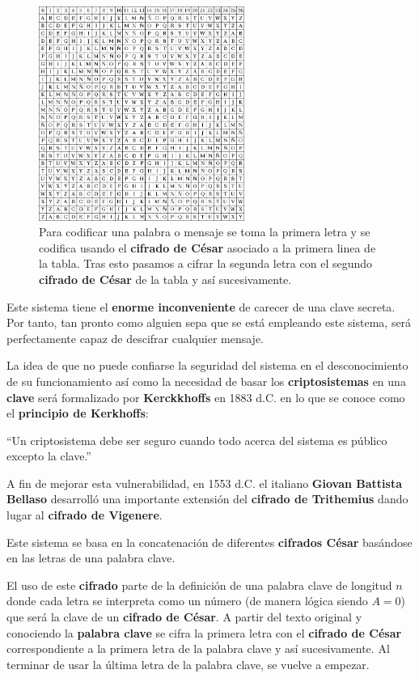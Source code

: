 \documentclass[nochap]{apuntesURJC}
\begin{document}
\begin{figure}[hbtp]
\centering
\includegraphics[width=0.6\textwidth]{img/tabula_recta.png}
\caption{Para codificar una palabra o mensaje se toma la primera letra y se codifica usando el \textbf{cifrado de César} asociado a la primera linea de la tabla. Tras esto pasamos a cifrar la segunda letra con el segundo \textbf{cifrado de César} de la tabla y así sucesivamente.}
\label{fig:tabula_recta}
\end{figure}

Este sistema tiene el \textbf{enorme inconveniente} de carecer de una clave secreta. Por tanto, tan pronto como alguien sepa que se está empleando este sistema, será perfectamente capaz de descifrar cualquier mensaje.

La idea de que no puede confiarse la seguridad del sistema en el desconocimiento de su funcionamiento así como la necesidad de basar los \textbf{criptosistemas} en una \textbf{clave} será formalizado por \textbf{Kerckkhoffs} en 1883 d.C. en lo que se conoce como el \textbf{principio de Kerkhoffs}:
\begin{center}
``Un criptosistema debe ser seguro cuando todo acerca del sistema es público excepto la clave.''
\end{center}

A fin de mejorar esta vulnerabilidad, en 1553 d.C. el italiano \textbf{Giovan Battista Bellaso} desarrolló una importante extensión del \textbf{cifrado de Trithemius} dando lugar al \textbf{cifrado de Vigenere}.

Este sistema se basa en la concatenación de diferentes \textbf{cifrados César} basándose en las letras de una palabra clave.

El uso de este \textbf{cifrado} parte de la definición de una palabra clave de longitud $n$ donde cada letra se interpreta como un número (de manera lógica siendo $A=0$) que será la clave de un \textbf{cifrado de César}. A partir del texto original y conociendo la \textbf{palabra clave} se cifra la primera letra con el \textbf{cifrado de César} correspondiente a la primera letra de la palabra clave y así sucesivamente. Al terminar de usar la última letra de la palabra clave, se vuelve a empezar.
\end{document}
